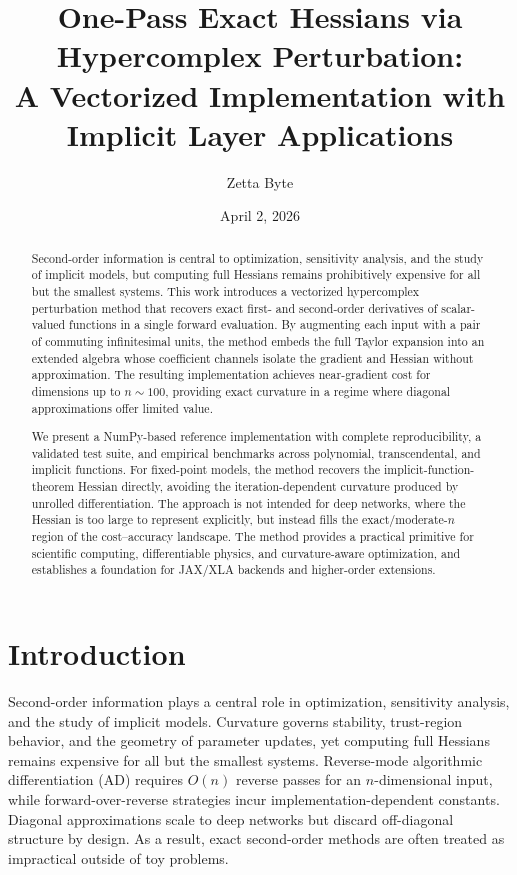 \documentclass[11pt]{article}
\title{One-Pass Exact Hessians via Hypercomplex Perturbation:\\
       A Vectorized Implementation with Implicit Layer Applications}
\author{Zetta Byte}
\date{April 2, 2026}
\begin{document}
\maketitle

\begin{abstract}
Second-order information is central to optimization, sensitivity analysis, and the
study of implicit models, but computing full Hessians remains prohibitively expensive
for all but the smallest systems. This work introduces a vectorized hypercomplex
perturbation method that recovers exact first- and second-order derivatives of
scalar-valued functions in a single forward evaluation. By augmenting each input with
a pair of commuting infinitesimal units, the method embeds the full Taylor expansion
into an extended algebra whose coefficient channels isolate the gradient and Hessian
without approximation. The resulting implementation achieves near-gradient cost for
dimensions up to $n \sim 100$, providing exact curvature in a regime where diagonal
approximations offer limited value.

We present a NumPy-based reference implementation with complete reproducibility,
a validated test suite, and empirical benchmarks across polynomial, transcendental,
and implicit functions. For fixed-point models, the method recovers the
implicit-function-theorem Hessian directly, avoiding the iteration-dependent curvature
produced by unrolled differentiation. The approach is not intended for deep networks,
where the Hessian is too large to represent explicitly, but instead fills the
exact/moderate-$n$ region of the cost--accuracy landscape. The method provides a
practical primitive for scientific computing, differentiable physics, and
curvature-aware optimization, and establishes a foundation for JAX/XLA backends and
higher-order extensions.
\end{abstract}

\section{Introduction}

Second-order information plays a central role in optimization, sensitivity analysis,
and the study of implicit models. Curvature governs stability, trust-region behavior,
and the geometry of parameter updates, yet computing full Hessians remains expensive
for all but the smallest systems. Reverse-mode algorithmic differentiation (AD)
requires $O(n)$ reverse passes for an $n$-dimensional input, while forward-over-reverse
strategies incur implementation-dependent constants. Diagonal approximations scale to
deep networks but discard off-diagonal structure by design. As a result, exact
second-order methods are often treated as impractical outside of toy problems.
\end{document}
